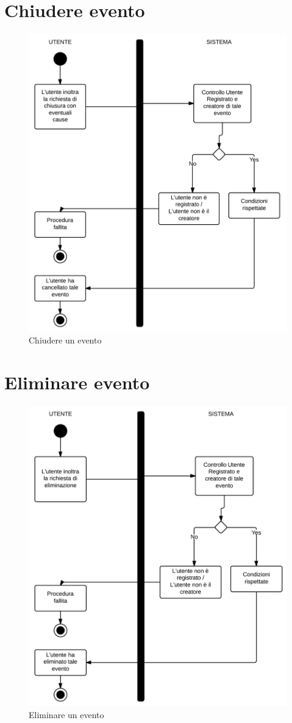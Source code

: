 \section{Chiudere evento}
\begin{figure}[H]
\centering
\includegraphics[scale=0.27]{img/activity/chiude.png}
\caption{Chiudere un evento}
\label{fig:attchiude}
\end{figure}

\section{Eliminare evento}
\begin{figure}[H]
\centering
\includegraphics[scale=0.27]{img/activity/elimina.png}
\caption{Eliminare un evento}
\label{fig:accelimina}
\end{figure}
